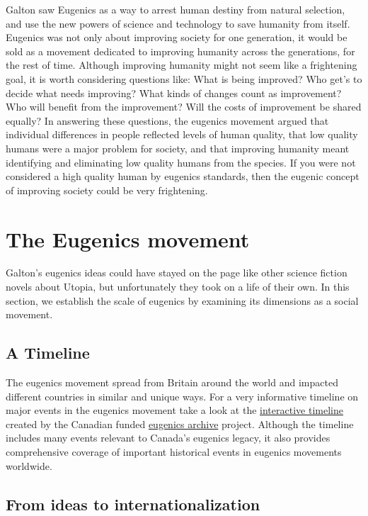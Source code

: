 \documentclass[
  oneside,
  12pt]{crumpbook}
\begin{document}
Galton saw Eugenics as a way to arrest human destiny from natural selection, and use the new powers of science and technology to save humanity from itself. Eugenics was not only about improving society for one generation, it would be sold as a movement dedicated to improving humanity across the generations, for the rest of time. Although improving humanity might not seem like a frightening goal, it is worth considering questions like: What is being improved? Who get's to decide what needs improving? What kinds of changes count as improvement? Who will benefit from the improvement? Will the costs of improvement be shared equally? In answering these questions, the eugenics movement argued that individual differences in people reflected levels of human quality, that low quality humans were a major problem for society, and that improving humanity meant identifying and eliminating low quality humans from the species. If you were not considered a high quality human by eugenics standards, then the eugenic concept of improving society could be very frightening.

\hypertarget{the-eugenics-movement}{%
\section{The Eugenics movement}\label{the-eugenics-movement}}

Galton's eugenics ideas could have stayed on the page like other science fiction novels about Utopia, but unfortunately they took on a life of their own. In this section, we establish the scale of eugenics by examining its dimensions as a social movement.

\hypertarget{a-timeline}{%
\subsection{A Timeline}\label{a-timeline}}

The eugenics movement spread from Britain around the world and impacted different countries in similar and unique ways. For a very informative timeline on major events in the eugenics movement take a look at the \href{https://eugenicsarchive.ca/discover/timeline}{interactive timeline} created by the Canadian funded \href{https://eugenicsarchive.ca/}{eugenics archive} project. Although the timeline includes many events relevant to Canada's eugenics legacy, it also provides comprehensive coverage of important historical events in eugenics movements worldwide.

\hypertarget{from-ideas-to-internationalization}{%
\subsection{From ideas to internationalization}\label{from-ideas-to-internationalization}}
\end{document}
